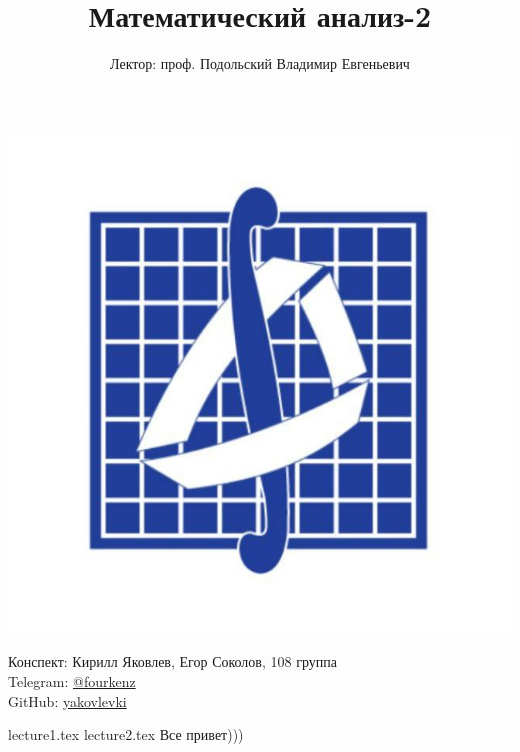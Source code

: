 \documentclass[a4paper, 12pt]{article}
\title{\textbf{Математический анализ-2}}
\author{Лектор: проф. Подольский Владимир Евгеньевич}
\begin{document}
    
\fontsize{14pt}{20pt}\selectfont
\maketitle
\vspace{0.3cm}
\begin{center}
    \includegraphics[width=0.75\linewidth]{Images/mehmat.png}
\end{center}
\vspace{1.5cm}
\begin{center}
    Конспект: Кирилл Яковлев, Егор Соколов, 108 группа\\
    Telegram: \href{https://t.me/fourkenz}{@fourkenz}\\
    GitHub: \href{https://github.com/yakovlevki}{yakovlevki}\\
\end{center}
    
\newpage
\tableofcontents
\newpage

{lecture1.tex}
{lecture2.tex}
Все привет)))
\end{document}
